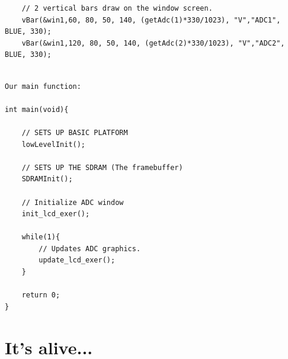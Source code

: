 \begin{lstlisting}
	// 2 vertical bars draw on the window screen.
	vBar(&win1,60, 80, 50, 140, (getAdc(1)*330/1023), "V","ADC1", BLUE, 330);
	vBar(&win1,120, 80, 50, 140, (getAdc(2)*330/1023), "V","ADC2", BLUE, 330);
	
\end{lstlisting}


\begin{lstlisting}
Our main function:

int main(void){

	// SETS UP BASIC PLATFORM
	lowLevelInit(); 		
	
	// SETS UP THE SDRAM (The framebuffer)
	SDRAMInit(); 

	// Initialize ADC window
	init_lcd_exer();

	while(1){
		// Updates ADC graphics.
		update_lcd_exer();
	}

	return 0;
}
\end{lstlisting}


\section{It's alive...}



